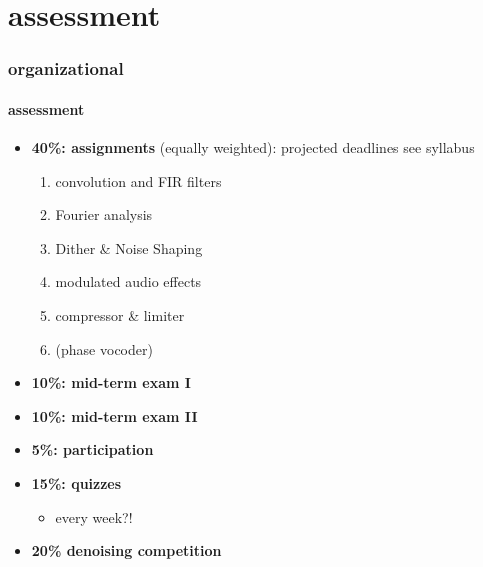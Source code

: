     \section{assessment}
        \begin{frame}\frametitle{organizational}\framesubtitle{assessment}
            \begin{itemize}
                \item	\textbf{40\%: assignments} (equally weighted): projected deadlines see syllabus
                        \begin{enumerate}
                            \item	convolution and FIR filters
                            \item   Fourier analysis
                            \item   Dither \& Noise Shaping
                            \item   modulated audio effects
                            \item   compressor \& limiter
                            \item   (phase vocoder)
                        \end{enumerate}

                \smallskip
                \item   \textbf{10\%: mid-term exam I}
                \item   \textbf{10\%: mid-term exam II}

                \smallskip
                \item   \textbf{5\%: participation}

                \smallskip
                \item   \textbf{15\%: quizzes}
                    \begin{itemize}
                        \item   every week?! 
                    \end{itemize}
                
                \smallskip
                \item   \textbf{20\% denoising competition}
            \end{itemize}
        \end{frame}

